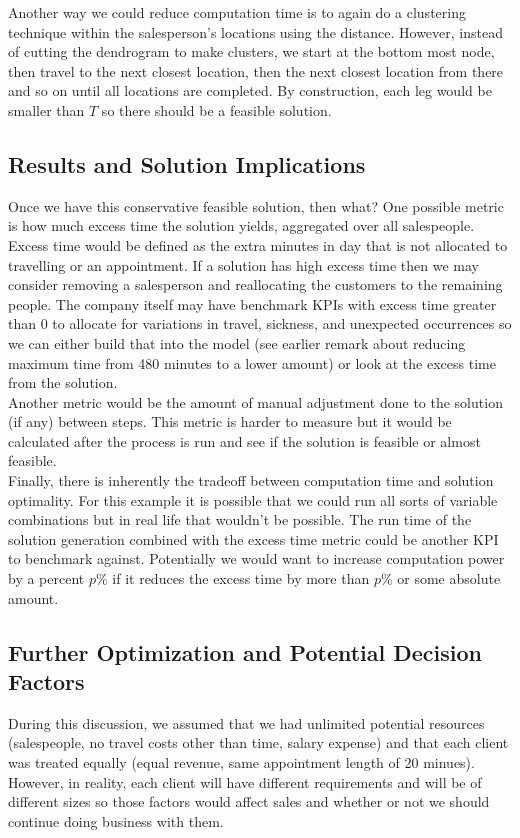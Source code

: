 \documentclass{article}
\begin{document}
Another way we could reduce computation time is to again do a clustering technique within the salesperson's locations using the distance.  However, instead of cutting the dendrogram to make clusters, we start at the bottom most node, then travel to the next closest location, then the next closest location from there and so on until all locations are completed.  By construction, each leg would be smaller than $T$ so there should be a feasible solution.\\

\subsection{Results and Solution Implications}
Once we have this conservative feasible solution, then what? One possible metric is how much excess time the solution yields, aggregated over all salespeople.  Excess time would be defined as the extra minutes in day that is not allocated to travelling or an appointment.  If a solution has high excess time then we may consider removing a salesperson and reallocating the customers to the remaining people.  The company itself may have benchmark KPIs with excess time greater than 0 to allocate for variations in travel, sickness, and unexpected occurrences so we can either build that into the model (see earlier remark about reducing maximum time from 480 minutes to a lower amount) or look at the excess time from the solution.\\

Another metric would be the amount of manual adjustment done to the solution (if any) between steps.  This metric is harder to measure but it would be calculated after the process is run and see if the solution is feasible or almost feasible.\\

Finally, there is inherently the tradeoff between computation time and solution optimality.  For this example it is possible that we could run all sorts of variable combinations but in real life that wouldn't be possible.  The run time of the solution generation combined with the excess time metric could be another KPI to benchmark against. Potentially we would want to increase computation power by a percent $p\%$ if it reduces the excess time by more than $p\%$ or some absolute amount.\\

\subsection{Further Optimization and Potential Decision Factors}
During this discussion, we assumed that we had unlimited potential resources (salespeople, no travel costs other than time, salary expense) and that each client was treated equally (equal revenue, same appointment length of 20 minues).  However, in reality, each client will have different requirements and will be of different sizes so those factors would affect sales and whether or not we should continue doing business with them.\\
\end{document}
